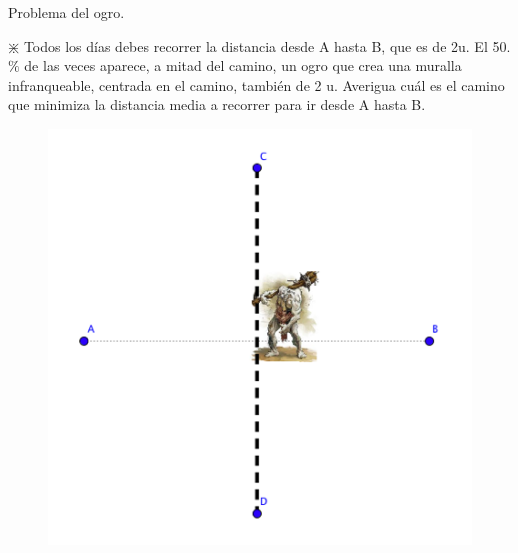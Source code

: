 \vspace{7mm}
	
	\begin{ejre}  Problema del ogro.
	\begin{multicols}{2}

	$\divideontimes$ Todos los días debes recorrer la distancia desde A hasta B, que es de 2u. El 50. $\%$ de las veces aparece, a mitad del camino, un ogro que crea una muralla infranqueable, centrada en el camino, también de 2 u. Averigua cuál es el camino que minimiza la distancia media a recorrer para ir desde A hasta B.

	\begin{figure}[H]
	\centering
	\includegraphics[width=.4\textwidth]{imagenes/imagenes05/T05IM20.png}
	\end{figure}
	\end{multicols}
	
	
	\end{ejre}
	
